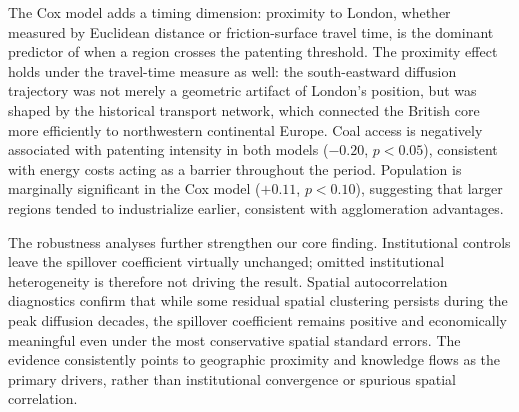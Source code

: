 \documentclass[letterpaper,12pt,leqno]{article}
\begin{document}
The Cox model adds a timing dimension: proximity to London, whether measured by Euclidean distance or friction-surface travel time, is the dominant predictor of when a region crosses the patenting threshold. The proximity effect holds under the travel-time measure as well: the south-eastward diffusion trajectory was not merely a geometric artifact of London's position, but was shaped by the historical transport network, which connected the British core more efficiently to northwestern continental Europe. Coal access is negatively associated with patenting intensity in both models (\(-0.20\), \(p < 0.05\)), consistent with energy costs acting as a barrier throughout the period. Population is marginally significant in the Cox model (\(+0.11\), \(p < 0.10\)), suggesting that larger regions tended to industrialize earlier, consistent with agglomeration advantages.

The robustness analyses further strengthen our core finding. Institutional controls leave the spillover coefficient virtually unchanged; omitted institutional heterogeneity is therefore not driving the result. Spatial autocorrelation diagnostics confirm that while some residual spatial clustering persists during the peak diffusion decades, the spillover coefficient remains positive and economically meaningful even under the most conservative spatial standard errors. The evidence consistently points to geographic proximity and knowledge flows as the primary drivers, rather than institutional convergence or spurious spatial correlation.
\end{document}
